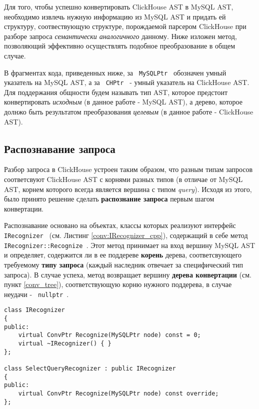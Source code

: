 Для того, чтобы успешно конвертировать ClickHouse AST в MySQL AST, необходимо извлечь нужную информацию из MySQL AST и придать ей структуру, соотвествующую структуре, порождаемой парсером ClickHouse при разборе запроса \textit{семантически аналогичного} данному. Ниже изложен метод, позволяющий эффективно осуществлять подобное преобразование в общем случае.

В фрагментах кода, приведенных ниже, за \texttt{ MySQLPtr } обозначен умный указатель на MySQL AST, а за \texttt{ CHPtr } - умный указатель на ClickHouse AST. Для поддержания общности будем называть тип AST, которое предстоит конвертировать \textit{исходным} (в данное работе - MySQL AST), а дерево, которое долнжо быть результатом преобразования \textit{целевым} (в данное работе - ClickHouse AST).

\subsection{Распознавание запроса}
Разбор запроса в ClickHouse устроен таким образом, что разным типам запросов соответсвуют ClickHouse AST с корнями разных типов (в отличае от MySQL AST, корнем которого всегда является вершина с типом \textit{query}). Исходя из этого, было принято решение сделать \textbf{распознание запроса} первым шагом конвертации.

Распознавание основано на объектах, классы которых реализуют интерфейс \texttt{ IRecognizer } (см. Листинг \ref{conv:IRecognizer_cpp}), содержащий в себе метод \texttt{ IRecognizer::Recognize }. Этот метод принимает на вход вершину MySQL AST и определяет, содержится ли в ее поддереве \textbf{корень} дерева, соответсвующего требуемому \textbf{типу запроса} (каждый наследник отвечает за специфический тип запроса). В случае успеха, метод возвращает вершину \textbf{дерева конвертации} (см. пункт \ref{conv_tree}), соответствующую корню нужного поддерева, в случае неудачи - \texttt{ nullptr }.

\begin{code}
    \label{conv:IRecognizer_cpp}
    \begin{verbatim}
class IRecognizer
{
public:
    virtual ConvPtr Recognize(MySQLPtr node) const = 0;
    virtual ~IRecognizer() { }
};

class SelectQueryRecognizer : public IRecognizer
{
public:
    virtual ConvPtr Recognize(MySQLPtr node) const override;
};
    \end{verbatim}
\end{code}

